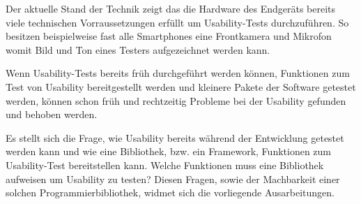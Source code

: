 Der aktuelle Stand der Technik zeigt das die Hardware des Endgeräts bereits viele technischen Vorraussetzungen erfüllt um Usability-Tests durchzuführen. So besitzen beispielweise fast alle Smartphones eine Frontkamera und Mikrofon womit Bild und Ton eines Testers aufgezeichnet werden kann. 

Wenn Usability-Tests bereits früh durchgeführt werden können, Funktionen zum Test von Usability bereitgestellt werden und kleinere Pakete der Software getestet werden, können schon früh und rechtzeitig Probleme bei der Usability gefunden und behoben werden.

Es stellt sich die Frage, wie Usability bereits während der Entwicklung getestet werden kann und wie eine Bibliothek, bzw. ein Framework, Funktionen zum Usability-Test bereitstellen kann. Welche Funktionen muss eine Bibliothek aufweisen um Usability zu testen? Diesen Fragen, sowie der Machbarkeit einer solchen Programmierbibliothek, widmet sich die vorliegende Ausarbeitungen. 





